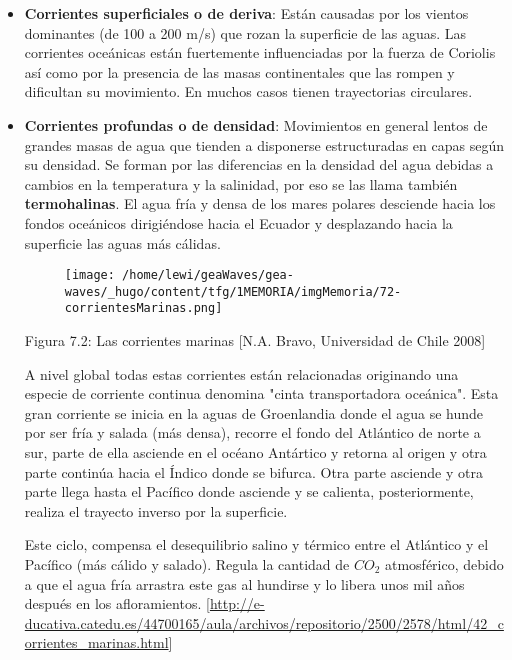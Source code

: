 \begin{itemize}
\item
  \textbf{Corrientes superficiales o de deriva}: Están causadas por los
  vientos dominantes (de 100 a 200 m/s) que rozan la superficie de las
  aguas. Las corrientes oceánicas están fuertemente influenciadas por la
  fuerza de Coriolis así como por la presencia de las masas
  continentales que las rompen y dificultan su movimiento. En muchos
  casos tienen trayectorias circulares.
\item
  \textbf{Corrientes profundas o de densidad}: Movimientos en general
  lentos de grandes masas de agua que tienden a disponerse estructuradas
  en capas según su densidad. Se forman por las diferencias en la
  densidad del agua debidas a cambios en la temperatura y la salinidad,
  por eso se las llama también \textbf{termohalinas}. El agua fría y
  densa de los mares polares desciende hacia los fondos oceánicos
  dirigiéndose hacia el Ecuador y desplazando hacia la superficie las
  aguas más cálidas.

  \begin{figure}
  \centering
  \texttt{[image: /home/lewi/geaWaves/gea-waves/\_hugo/content/tfg/1MEMORIA/imgMemoria/72-corrientesMarinas.png]}
  \caption{}
  \end{figure}

  Figura 7.2: Las corrientes marinas {[}N.A. Bravo, Universidad de Chile
  2008{]}

  A nivel global todas estas corrientes están relacionadas originando
  una especie de corriente continua denomina "cinta transportadora
  oceánica". Esta gran corriente se inicia en la aguas de Groenlandia
  donde el agua se hunde por ser fría y salada (más densa), recorre el
  fondo del Atlántico de norte a sur, parte de ella asciende en el
  océano Antártico y retorna al origen y otra parte continúa hacia el
  Índico donde se bifurca. Otra parte asciende y otra parte llega hasta
  el Pacífico donde asciende y se calienta, posteriormente, realiza el
  trayecto inverso por la superficie.

  Este ciclo, compensa el desequilibrio salino y térmico entre el
  Atlántico y el Pacífico (más cálido y salado). Regula la cantidad de
  \(CO_2\) atmosférico, debido a que el agua fría arrastra este gas al
  hundirse y lo libera unos mil años después en los afloramientos.
  {[}\url{http://e-ducativa.catedu.es/44700165/aula/archivos/repositorio/2500/2578/html/42_corrientes_marinas.html}{]}
\end{itemize}

